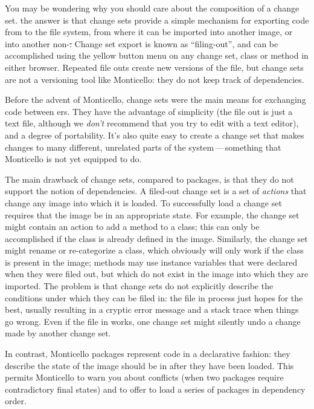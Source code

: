 \documentclass[a4paper,10pt,twoside]{book}
\begin{document}
You may be wondering why you should care about the composition of a change set.
the answer is that change sets provide a simple mechanism for exporting code from \sq to the file system, from where it can be imported into another \sq image, or into another non-\sq \st.
Change set export is known as ``filing-out'', and can be accomplished using the yellow button menu on any change set, class or method in either browser.
Repeated file outs create new versions of the file, but change sets are not a versioning tool like Monticello:
they do not keep track of dependencies.

Before the advent of Monticello, change sets were the main means for exchanging code between \sq{}ers.
They have the advantage of simplicity (the file out is just a text file, although we \emph{don't} recommend that you try to edit with a text editor), and a degree of portability.  
It's also quite easy to create a change set that makes changes to many different, unrelated parts of the system\,---\,something that Monticello is not yet equipped to do.

The main drawback of change sets, compared to  packages, is that they do not support the notion of dependencies.
A filed-out change set is a set of \emph{actions} that change any image into which it is loaded. To successfully load a change set requires that the image be in an appropriate state.
For example, the change set might contain an action to add a method to a class; this can only be accomplished if the class is already defined in the image.
Similarly, the change set might rename or re-categorize a class, which obviously will only work if the class is present in the image; methods may use instance variables that were declared when they were filed out, but which do not exist in the image into which they are imported.
The problem is that change sets do not explicitly describe the conditions under which they can be filed in:
the file in process just hopes for the best, usually resulting in a cryptic error message and a stack trace when things go wrong.
Even if the file in works, one change set might silently undo a change made by another change set.

In contrast, Monticello packages represent code in a declarative fashion: they describe the state of the image should be in after they have been loaded.
This permits Monticello to warn you about conflicts (when two packages require contradictory final states)
and to offer to load a series of packages in dependency order.
\end{document}
